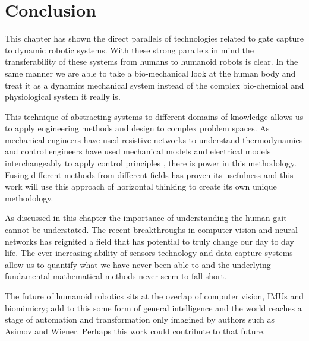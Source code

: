 \section{Conclusion}
This chapter has shown the direct parallels of technologies related to gate capture to dynamic robotic systems. With these strong parallels in mind the transferability of these systems from humans to humanoid robots is clear. In the same manner we are able to take a bio-mechanical look at the human body and treat it as a dynamics mechanical system instead of the complex bio-chemical and physiological system it really is.

This technique of abstracting systems to different domains of knowledge allows us to apply engineering methods and design to complex problem spaces. As mechanical engineers have used resistive networks to understand thermodynamics \cite{chen2015electrical} and control engineers have used mechanical models and electrical models interchangeably to apply control principles \cite{karnopp2012system}, there is power in this methodology. Fusing different methods from different fields has proven its usefulness and this work will use this approach of horizontal thinking to create its own unique methodology.

As discussed in this chapter the importance of understanding the human gait cannot be understated. The recent breakthroughs in computer vision and neural networks has reignited a field that has potential to truly change our day to day life. The ever increasing ability of sensors technology and data capture systems allow us to quantify what we have never been able to and the underlying fundamental mathematical methods never seem to fall short.

The future of humanoid robotics sits at the overlap of computer vision, IMUs and biomimicry; add to this some form of general intelligence and the world reaches a stage of automation and transformation only imagined by authors such as Asimov and Wiener. Perhaps this work could contribute to that future.

































